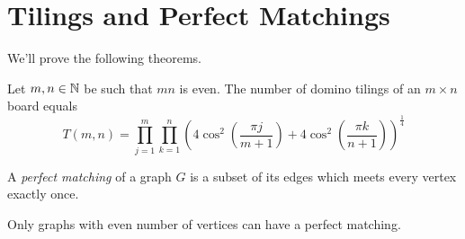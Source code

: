 \section{Tilings and Perfect Matchings}
We'll prove the following theorems.
\begin{theorem}[Kasteleyn (1961)]
Let \(m,n\in\mathbb{N}\) be such that \(mn\) is even.
The number of domino tilings of an \(m\times n\) board equals
\[ T(m,n)=\prod_{j=1}^{m}\prod_{k=1}^n \left(4\cos^2\left(\frac{\pi j}{m+1}\right) + 4\cos^2\left(\frac{\pi k}{n+1}\right)\right)^{\frac{1}{4}} \]
\end{theorem}

\begin{definition}
A \emph{perfect matching} of a graph \(G\) is a subset of its edges which meets every vertex exactly once.
\end{definition}
\begin{remark}
Only graphs with even number of vertices can have a perfect matching.
\end{remark}